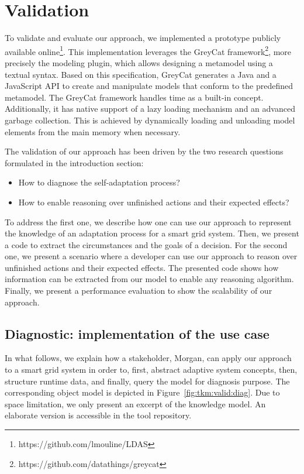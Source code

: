 \section{Validation}
\label{sec:tkm:validation}

To validate and evaluate our approach, we implemented a prototype publicly available online\footnote{https://github.com/lmouline/LDAS}.
This implementation leverages the GreyCat framework\footnote{https://github.com/datathings/greycat}, more precisely the modeling plugin, which allows designing a metamodel using a textual syntax.
Based on this specification, GreyCat generates a Java and a JavaScript API to create and manipulate models that conform to the predefined metamodel.
The GreyCat framework handles time as a built-in concept.
Additionally, it has native support of a lazy loading mechanism and an advanced garbage collection.
This is achieved by dynamically loading and unloading model elements from the main memory when necessary.

The validation of our approach has been driven by the two research questions formulated in the introduction section:
\begin{itemize}
    \item How to diagnose the self-adaptation process?
    \item How to enable reasoning over unfinished actions and their expected effects?
\end{itemize}

To address the first one, we describe how one can use our approach to represent the knowledge of an adaptation process for a smart grid system.
Then, we present a code to extract the circumstances and the goals of a decision.
For the second one, we present a scenario where a developer can use our approach to reason over unfinished actions and their expected effects.
The presented code shows how information can be extracted from our model to enable any reasoning algorithm.
Finally, we present a performance evaluation to show the scalability of our approach.

\subsection{Diagnostic: implementation of the use case}
In what follows, we explain how a stakeholder, Morgan, can apply our approach to a smart grid system in order to, first, abstract adaptive system concepts, then, structure runtime data, and finally, query the model for diagnosis purpose.
The corresponding object model is depicted in Figure~\ref{fig:tkm:valid:diag}.
Due to space limitation, we only present an excerpt of the knowledge model.
An elaborate version is accessible in the tool repository.

